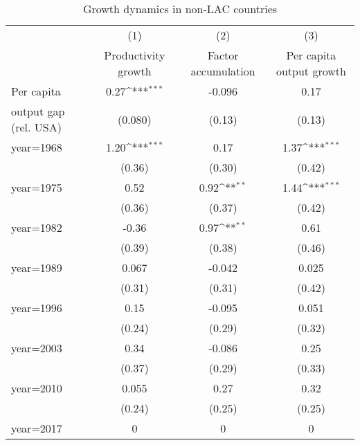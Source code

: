 \begin{table}[htbp]\centering
\def\sym#1{\ifmmode^{#1}\else\(^{#1}\)\fi}
\caption{Growth dynamics in non-LAC countries}
\begin{tabular}{l*{3}{c}}
\toprule
                &\multicolumn{1}{c}{(1)}&\multicolumn{1}{c}{(2)}&\multicolumn{1}{c}{(3)}\\
                &\multicolumn{1}{c}{Productivity growth}&\multicolumn{1}{c}{Factor accumulation}&\multicolumn{1}{c}{Per capita output growth}\\
\midrule
Per capita      &     0.27\sym{***}&   -0.096         &     0.17         \\
output gap (rel. USA)&  (0.080)         &   (0.13)         &   (0.13)         \\
\addlinespace
year=1968       &     1.20\sym{***}&     0.17         &     1.37\sym{***}\\
                &   (0.36)         &   (0.30)         &   (0.42)         \\
\addlinespace
year=1975       &     0.52         &     0.92\sym{**} &     1.44\sym{***}\\
                &   (0.36)         &   (0.37)         &   (0.42)         \\
\addlinespace
year=1982       &    -0.36         &     0.97\sym{**} &     0.61         \\
                &   (0.39)         &   (0.38)         &   (0.46)         \\
\addlinespace
year=1989       &    0.067         &   -0.042         &    0.025         \\
                &   (0.31)         &   (0.31)         &   (0.42)         \\
\addlinespace
year=1996       &     0.15         &   -0.095         &    0.051         \\
                &   (0.24)         &   (0.29)         &   (0.32)         \\
\addlinespace
year=2003       &     0.34         &   -0.086         &     0.25         \\
                &   (0.37)         &   (0.29)         &   (0.33)         \\
\addlinespace
year=2010       &    0.055         &     0.27         &     0.32         \\
                &   (0.24)         &   (0.25)         &   (0.25)         \\
\addlinespace
year=2017       &        0         &        0         &        0         \\

\end{tabular}
\end{table}
